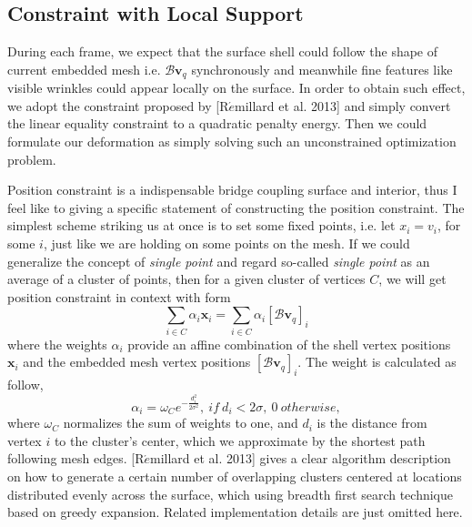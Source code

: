 \documentclass[a4paper,9pt,twocolumn]{extarticle}
\begin{document}
\subsection{Constraint with Local Support}
During each frame, we expect that the surface shell could follow the shape of current embedded mesh i.e. $\mathcal{B}\textbf{v}_q$ synchronously and meanwhile fine features like visible wrinkles could appear locally on the surface. In order to obtain such effect, we adopt the constraint proposed by [R$\acute{e}$millard et al. 2013] and simply convert the linear equality constraint to a quadratic penalty energy. Then we could formulate our deformation as simply solving such an unconstrained optimization problem.

Position constraint is a indispensable bridge coupling surface and interior, thus I feel like to giving a specific statement of constructing the position constraint. The simplest scheme striking us at once is to set some fixed points, i.e. let $x_i=v_i$, for some $i$, just like we are holding on some points on the mesh. If we could generalize the concept of \textit{single point} and regard so-called \textit{single point} as an average of a cluster of points, then for a given cluster of vertices $C$, we will get position constraint in context with form
\begin{equation}
  \sum_{i\in C}\alpha_i \textbf{x}_i = \sum_{i\in C}\alpha_i [\mathcal{B}\textbf{v}_q]_i
\end{equation}
where the weights $\alpha_i$ provide an affine combination of the shell vertex positions $\textbf{x}_i$ and the embedded mesh vertex positions $[\mathcal{B}\textbf{v}_q]_i$. The weight is calculated as follow,
\begin{equation}
  \alpha_i = \omega_C e^{-\frac{d_i^2}{2\sigma^2}}, \ if \ d_i < 2\sigma, \ 0\ otherwise,
\end{equation}
where $\omega_C$ normalizes the sum of weights to one, and $d_i$ is the distance from vertex $i$ to the cluster's center, which we approximate by the shortest path following mesh edges. [R$\acute{e}$millard et al. 2013] gives a clear algorithm description on how to generate a certain number of overlapping clusters centered at locations distributed evenly across the surface, which using breadth first search technique based on greedy expansion. Related implementation details are just omitted here.
\end{document}
